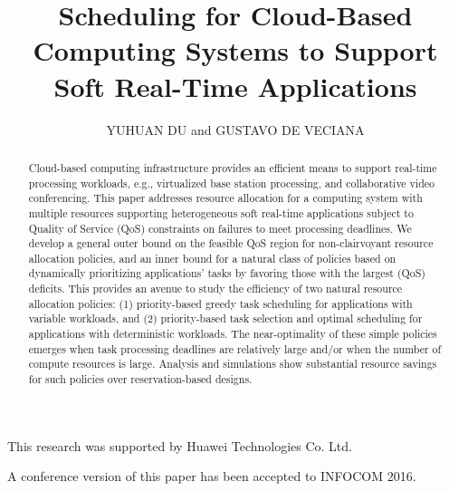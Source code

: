 \documentclass[prodmode,acmtompecs]{acmsmall}
\newcommand{\add}[1]{#1}
\begin{document}

\title{Scheduling for Cloud-Based Computing Systems to Support Soft Real-Time Applications}
\author{YUHUAN DU and GUSTAVO DE VECIANA
}

\begin{abstract}
Cloud-based computing infrastructure provides an efficient means to support real-time processing workloads, e.g., virtualized base station processing, and collaborative video conferencing. This paper addresses resource allocation for a computing system with multiple resources supporting heterogeneous soft real-time applications subject to Quality of Service (QoS) constraints on failures to meet processing deadlines. We develop a general outer bound on the feasible QoS region for non-clairvoyant resource allocation policies, and an inner bound for a natural class of policies based on dynamically prioritizing applications' tasks by favoring those with the largest (QoS) deficits. This provides an avenue to study the efficiency of two natural resource allocation policies: (1) priority-based greedy task scheduling for applications with variable workloads, and (2) priority-based task selection and optimal scheduling for applications with deterministic workloads. The near-optimality of these simple policies emerges when task processing deadlines are relatively large and/or when the number of compute resources is large. Analysis and simulations show substantial resource savings for such policies over reservation-based designs.
\end{abstract}


\begin{bottomstuff}
\add{
This research was supported by Huawei Technologies Co. Ltd.}

\add{A conference version of this paper has been accepted to INFOCOM 2016. 
}
\end{bottomstuff}

\maketitle
\end{document}
